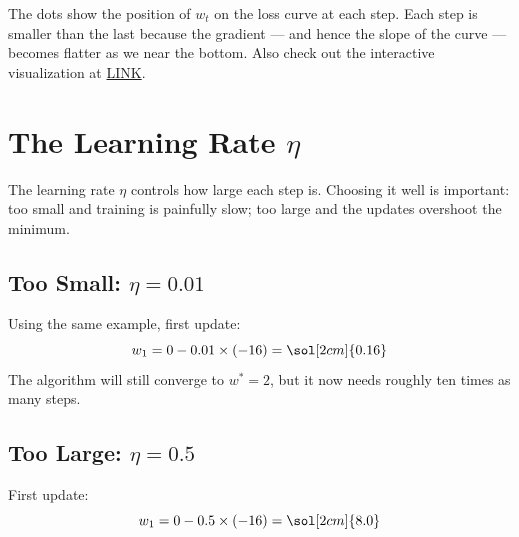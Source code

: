 \documentclass[12pt, a4paper]{article}
\begin{document}
\begin{center}
\end{center}

The dots show the position of $w_t$ on the loss curve at each step.
Each step is smaller than the last because the gradient --- and hence the
slope of the curve --- becomes flatter as we near the bottom.  Also check out the interactive visualization at \href{https://algomaster.io/animations/ai-ml/ml-gradient-descent}{LINK}.

\section{The Learning Rate $\eta$}

The learning rate $\eta$ controls how large each step is.
Choosing it well is important: too small and training is painfully slow;
too large and the updates overshoot the minimum.

\subsection*{Too Small: $\eta = 0.01$}

Using the same example, first update:
\[
  w_1 = 0 - 0.01 \times (-16) = \sol[2cm]{0.16}
\]
The algorithm will still converge to $w^* = 2$, but it now needs roughly
ten times as many steps.

\subsection*{Too Large: $\eta = 0.5$}

First update:
\[
  w_1 = 0 - 0.5 \times (-16) = \sol[2cm]{8.0}
\]
\end{document}
